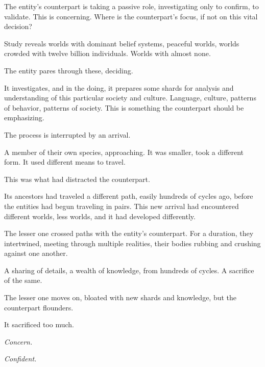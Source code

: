 The entity's counterpart is taking a passive role, investigating only to confirm, to validate.  This is concerning.  Where is the counterpart's focus, if not on this vital decision?



Study reveals worlds with dominant belief systems, peaceful worlds, worlds crowded with twelve billion individuals.  Worlds with almost none.



The entity pares through these, deciding.



It investigates, and in the doing, it prepares some shards for analysis and understanding of this particular society and culture.  Language, culture, patterns of behavior, patterns of society.  This is something the counterpart should be emphasizing.



The process is interrupted by an arrival.



A member of their own species, approaching.  It was smaller, took a different form.  It used different means to travel.



This was what had distracted the counterpart.



Its ancestors had traveled a different path, easily hundreds of cycles ago, before the entities had begun traveling in pairs.  This new arrival had encountered different worlds, less worlds, and it had developed differently.



The lesser one crossed paths with the entity's counterpart.  For a duration, they intertwined, meeting through multiple realities, their bodies rubbing and crushing against one another.



A sharing of details, a wealth of knowledge, from hundreds of cycles.  A sacrifice of the same.



The lesser one moves on, bloated with new shards and knowledge, but the counterpart flounders.



It sacrificed too much.



\emph{Concern.}



\emph{Confident.}



